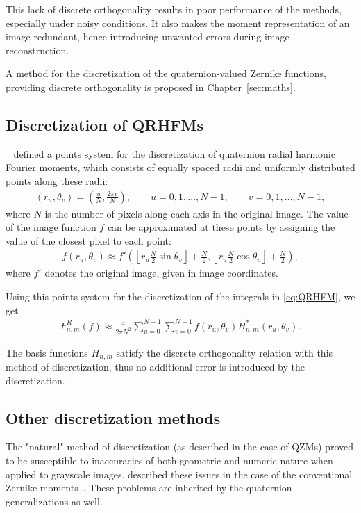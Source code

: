 This lack of discrete orthogonality results in poor performance of the methods, especially under noisy conditions. It also makes the moment representation of an image redundant, hence introducing unwanted errors during image reconstruction.


A method for the discretization of the quaternion-valued Zernike functions, providing discrete orthogonality is proposed in Chapter~\ref{sec:maths}.

\subsection{Discretization of QRHFMs}
\citeauthor{LiuAcc}~\cite{LiuAcc} defined a points system for the discretization of quaternion radial harmonic Fourier moments, which consists of equally spaced radii and uniformly distributed points along these radii:
\begin{gather*}
    (r_u, \theta_v) = \left(\frac{u}{N}, \frac{2\pi v}{N}\right), \qquad u = 0,1,\ldots ,N - 1, \qquad v = 0,1,\ldots ,N - 1,
\end{gather*}
where $N$ is the number of pixels along each axis in the original image. The value of the image function $f$ can be approximated at these points by assigning the value of the closest pixel to each point:
\begin{gather*}
    f(r_u, \theta_v) \approx f'\left(\left \lfloor r_u\frac{N}{2}\sin \theta_v \right \rfloor + \frac{N}{2}, \left \lfloor r_u\frac{N}{2}\cos \theta_v \right \rfloor + \frac{N}{2}\right),
\end{gather*}
where $f'$ denotes the original image, given in image coordinates.


Using this points system for the discretization of the integrals in \eqref{eq:QRHFM}, we get
\begin{gather*}
    F_{n,m}^R(f) \approx \frac{4}{2\pi N^2}\sum_{u = 0}^{N-1}\sum_{v = 0}^{N-1}f(r_u, \theta_v)H_{n,m}^*(r_u, \theta_v).
\end{gather*}


The basis functions $H_{n,m}$ satisfy the discrete orthogonality relation with this method of discretization, thus no additional error is introduced by the discretization.

\subsection{Other discretization methods}
The "natural" method of discretization (as described in the case of QZMs) proved to be susceptible to inaccuracies of both geometric and numeric nature when applied to grayscale images. \citeauthor{LiaoPawlak} described these issues in the case of the conventional Zernike moments~\cite{LiaoPawlak,PawlakLiao}. These problems are inherited by the quaternion generalizations as well. 


